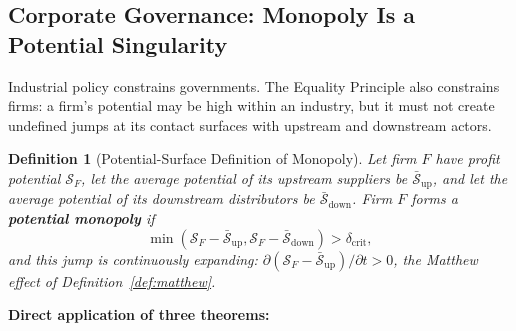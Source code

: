 \documentclass[12pt,a4paper]{article}
\newtheorem{definition}[theorem]{Definition}
\theoremstyle{remark}
\begin{document}
\subsection{Corporate Governance: Monopoly Is a Potential Singularity}

Industrial policy constrains governments. The Equality Principle also constrains firms: a firm's potential may be high within an industry, but it must not create undefined jumps at its contact surfaces with upstream and downstream actors.

\begin{definition}[Potential-Surface Definition of Monopoly]\label{def:monopoly_gauge}
Let firm $F$ have profit potential $\mathcal{S}_F$, let the average potential of its upstream suppliers be $\bar{\mathcal{S}}_{\text{up}}$, and let the average potential of its downstream distributors be $\bar{\mathcal{S}}_{\text{down}}$. Firm $F$ forms a \textbf{potential monopoly} if
\begin{equation}
    \min(\mathcal{S}_F - \bar{\mathcal{S}}_{\text{up}}, \mathcal{S}_F - \bar{\mathcal{S}}_{\text{down}}) > \delta_{\text{crit}},
\end{equation}
and this jump is continuously expanding: $\partial(\mathcal{S}_F - \bar{\mathcal{S}}_{\text{up}})/\partial t > 0$, the Matthew effect of Definition~\ref{def:matthew}.
\end{definition}

\textbf{Direct application of three theorems:}
\end{document}
